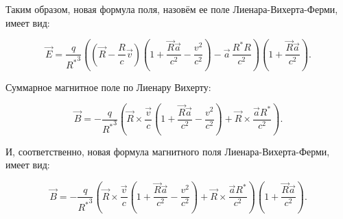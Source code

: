 \documentclass[12pt]{article}
\begin{document}
Таким образом, новая формула поля, назовём ее поле Лиенара-Вихерта-Ферми, имеет вид:

$$\vec{E} = \frac{q}{{{R}^{*}}^{3}}\left( \left(\vec{R}-\frac{R}{c}\vec{v} \right) \left(1 + \frac{\vec{R}\vec{a}}{c^2} - \frac{v^2}{c^2} \right) - \vec{a}\,\frac{{R}^{*}R}{c^2} \right) \left(1 + \frac{\vec{R}\vec{a}}{c^2}\right).$$


Суммарное магнитное поле по Лиенару Вихерту:

$$\vec{B} = -\frac{q}{{{R}^{*}}^3}\left(\vec{R}\times\frac{\vec{v}}{c}\left(1 + \frac{\vec{R}\vec{a}}{c^2} - \frac{v^2}{c^2}\right) + \vec{R}\times\frac{\vec{a}{{R}^{*}}}{c^2}\right).$$

И, соответственно, новая формула магнитного поля Лиенара-Вихерта-Ферми, имеет вид:

$$\vec{B} = -\frac{q}{{{R}^{*}}^3}\left(\vec{R}\times\frac{\vec{v}}{c}\left(1 + \frac{\vec{R}\vec{a}}{c^2} - \frac{v^2}{c^2}\right) + \vec{R}\times\frac{\vec{a}{{R}^{*}}}{c^2}\right) \left(1 + \frac{\vec{R}\vec{a}}{c^2}\right).$$
\end{document}

